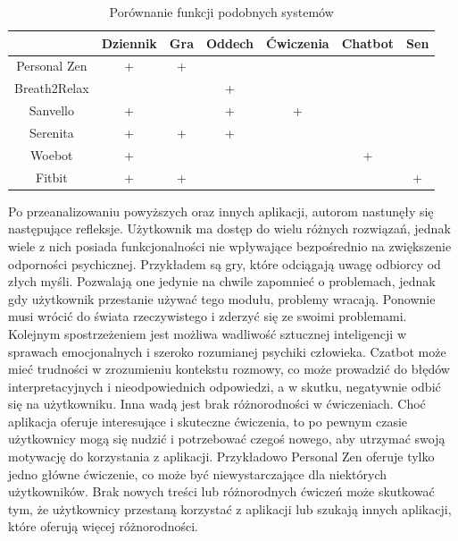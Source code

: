 \begin{table}[h]
    \small
    \centering
    \begin{tabular}{ | c | c | c | c | c | c | c | }
        \hline
                     & Dziennik & Gra & Oddech & Ćwiczenia & Chatbot & Sen \\
        \hline
        Personal Zen & +        & +   &        &           &         &     \\
        \hline
        Breath2Relax &          &     & +      &           &         &     \\
        \hline
        Sanvello     & +        &     & +      & +         &         &     \\
        \hline
        Serenita     & +        & +   & +      &           &         &     \\
        \hline
        Woebot       & +        &     &        &           & +       &     \\
        \hline
        Fitbit       & +        & +   &        &           &         & +   \\
        \hline
    \end{tabular}
    \caption{Porównanie funkcji podobnych systemów}
\end{table}

\pagebreak

Po przeanalizowaniu powyższych oraz innych aplikacji, autorom nastunęły się
następujące refleksje. Użytkownik ma dostęp do wielu różnych rozwiązań, jednak
wiele z nich posiada funkcjonalności nie wpływające bezpośrednio na zwiększenie
odporności psychicznej. Przykładem są gry, które odciągają uwagę odbiorcy od
złych myśli. Pozwalają one jedynie na chwile zapomnieć o problemach, jednak gdy
użytkownik przestanie używać tego modułu, problemy wracają. Ponownie musi wrócić
do świata rzeczywistego i zderzyć się ze swoimi problemami. Kolejnym
spostrzeżeniem jest możliwa wadliwość sztucznej inteligencji w sprawach
emocjonalnych i szeroko rozumianej psychiki człowieka. Czatbot może mieć
trudności w zrozumieniu kontekstu rozmowy, co może prowadzić do błędów
interpretacyjnych i nieodpowiednich odpowiedzi, a w skutku, negatywnie odbić się
na użytkowniku. Inna wadą jest brak różnorodności w ćwiczeniach. Choć aplikacja
oferuje interesujące i skuteczne ćwiczenia, to po pewnym czasie użytkownicy mogą
się nudzić i potrzebować czegoś nowego, aby utrzymać swoją motywację do
korzystania z aplikacji. Przykładowo Personal Zen oferuje tylko jedno główne
ćwiczenie, co może być niewystarczające dla niektórych użytkowników. Brak nowych
treści lub różnorodnych ćwiczeń może skutkować tym, że użytkownicy przestaną
korzystać z aplikacji lub szukają innych aplikacji, które oferują więcej
różnorodności.

